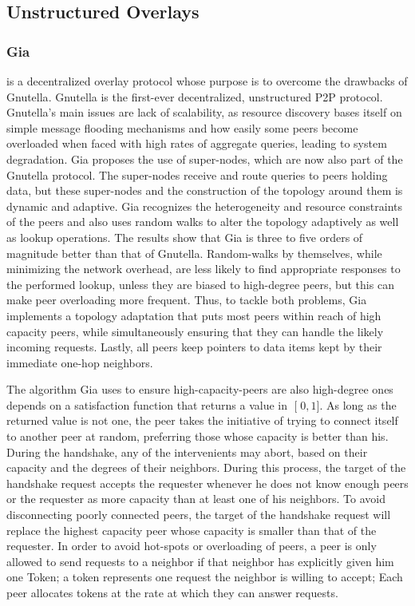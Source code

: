 \documentclass[runningheads]{llncs}
\begin{document}
\subsection{Unstructured Overlays}
\subsubsection{Gia} \cite{gia} is a decentralized overlay protocol whose purpose is to overcome the drawbacks of Gnutella\cite{gnutella-rfc, gnutella-cs}. Gnutella is the first-ever decentralized, unstructured P2P protocol. Gnutella's main issues are lack of scalability, as resource discovery bases itself on simple message flooding mechanisms and how easily some peers become overloaded when faced with high rates of aggregate queries, leading to system degradation. Gia proposes the use of super-nodes, which are now also part of the Gnutella protocol. The super-nodes receive and route queries to peers holding data, but these super-nodes and the construction of the topology around them is dynamic and adaptive. Gia recognizes the heterogeneity and resource constraints of the peers and also uses random walks to alter the topology adaptively as well as lookup operations. The results show that Gia is three to five orders of magnitude better than that of Gnutella. Random-walks by themselves, while minimizing the network overhead, are less likely to find appropriate responses to the performed lookup, unless they are biased to high-degree peers, but this can make peer overloading more frequent. Thus, to tackle both problems, Gia implements a topology adaptation that puts most peers within reach of high capacity peers, while simultaneously ensuring that they can handle the likely incoming requests. Lastly, all peers keep pointers to data items kept by their immediate one-hop neighbors.

The algorithm Gia uses to ensure high-capacity-peers are also high-degree ones depends on a satisfaction function that returns a value in $\mathclose[0,1\mathclose]$. As long as the returned value is not one, the peer takes the initiative of trying to connect itself to another peer at random, preferring those whose capacity is better than his. During the handshake, any of the intervenients may abort, based on their capacity and the degrees of their neighbors. During this process, the target of the handshake request accepts the requester whenever he does not know enough peers or the requester as more capacity than at least one of his neighbors. To avoid disconnecting poorly connected peers, the target of the handshake request will replace the highest capacity peer whose capacity is smaller than that of the requester. In order to avoid hot-spots or overloading of peers, a peer is only allowed to send requests to a neighbor if that neighbor has explicitly given him one Token; a token represents one request the neighbor is willing to accept; Each peer allocates tokens at the rate at which they can answer requests.
\end{document}
